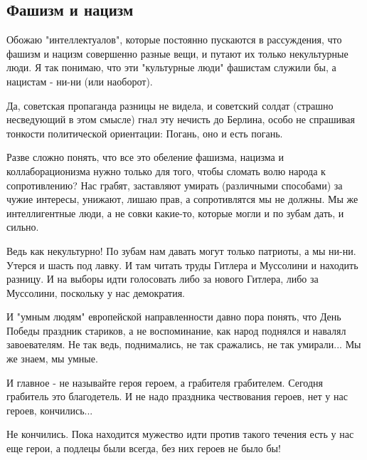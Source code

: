  
 

\subsection{Фашизм и нацизм}
\label{sec:29_10_2020.fb.denis_zharkih.1.nazism_fascism}


Обожаю "интеллектуалов", которые постоянно пускаются в рассуждения, что фашизм
и нацизм совершенно разные вещи, и путают их только некультурные люди. Я так
понимаю, что эти "культурные люди" фашистам служили бы, а нацистам - ни-ни (или
наоборот). 

Да, советская пропаганда разницы не видела, и советский солдат (страшно
несведующий в этом смысле) гнал эту нечисть до Берлина, особо не спрашивая
тонкости политической ориентации: Погань, оно и есть погань. 

Разве сложно понять, что все это обеление фашизма, нацизма и коллаборационизма
нужно только для того, чтобы сломать волю народа к сопротивлению? Нас грабят,
заставляют умирать (различными способами) за чужие интересы, унижают, лишаю
прав, а сопротивлятся мы не должны. Мы же интеллигентные люди, а не совки
какие-то, которые могли и по зубам дать, и сильно. 

Ведь как некультурно! По зубам нам давать могут только патриоты, а мы ни-ни.
Утерся и шасть под лавку. И там читать труды Гитлера и Муссолини и находить
разницу. И на выборы идти голосовать либо за нового Гитлера, либо за Муссолини,
поскольку у нас демократия. 

И "умным людям" европейской направленности давно пора понять, что День Победы
праздник стариков, а не воспоминание, как народ поднялся и навалял
завоевателям. Не так ведь, поднимались, не так сражались, не так умирали... Мы
же знаем, мы умные. 

И главное - не называйте героя героем, а грабителя грабителем. Сегодня
грабитель это благодетель. И не надо праздника чествования героев, нет у
нас героев, кончились... 

Не кончились. Пока находится мужество идти против такого течения есть у
нас еще герои, а подлецы были всегда, без них героев не было бы!
